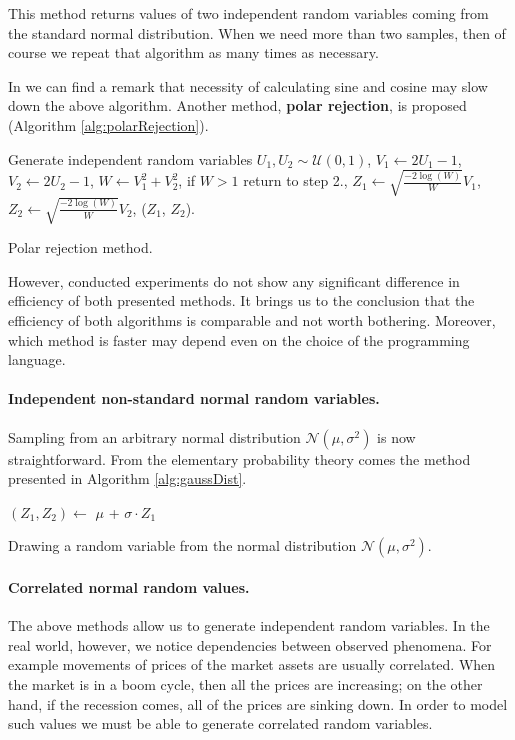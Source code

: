 \documentclass[a4paper,11pt, twoside]{book}
\theoremstyle{definition}
\theoremstyle{remark}
\newcounter{example}[chapter]
\begin{document}
This method returns values of two independent random variables coming from the standard normal distribution. When we need more than two samples, then of course we repeat that algorithm as many times as necessary.

In \cite{london} we can find a remark that necessity of calculating sine and cosine may slow down the above algorithm. Another method, \textbf{polar rejection}, is proposed (Algorithm \ref{alg:polarRejection}).
\begin{algorithm}
 \begin{algorithmic}[1]
    \State Generate independent random variables $U_1, U_2 \sim \mathcal{U}(0,1)$,
    \State $V_1 \gets 2U_1-1$,
    \State $V_2 \gets 2U_2-1$,
    \State $W \gets V_1^2 + V_2^2$,
    \State if $W > 1$ return to step 2.,
    \State $Z_1 \gets \sqrt{\frac{-2\log(W)}{W}} V_1$,
    \State $Z_2 \gets \sqrt{\frac{-2\log(W)}{W}} V_2$,
    \State \Return ($Z_1$, $Z_2$).
  \EndFunction
 \end{algorithmic}
 \caption{Polar rejection method.}
 \label{alg:polarRejection}
\end{algorithm}
However, conducted experiments do not show any significant difference in efficiency of both presented methods. It brings us to the conclusion that the efficiency of both algorithms is comparable and not worth bothering. Moreover, which method is faster may depend even on the choice of the programming language.

\paragraph{Independent non-standard normal random variables.} Sampling from an arbitrary normal distribution $\mathcal{N}(\mu, \sigma^2)$ is now straightforward. From the elementary probability theory comes the method presented in Algorithm \ref{alg:gaussDist}.
\begin{algorithm}
 \begin{algorithmic}[1]
    \State $(Z_1, Z_2) \gets $ 
    \State \Return $\mu$ + $\sigma \cdot Z_1$
  \EndFunction
 \end{algorithmic}
 \caption{Drawing a random variable from the normal distribution $\mathcal{N}(\mu, \sigma^2)$.}
 \label{alg:gaussDist}
\end{algorithm}

\paragraph{Correlated normal random values.} The above methods allow us to generate independent random variables. In the real world, however, we notice dependencies between observed phenomena. For example movements of prices of the market assets are usually correlated. When the market is in a boom cycle, then all the prices are increasing; on the other hand, if the recession comes, all of the prices are sinking down.
In order to model such values we must be able to generate correlated random variables.
\end{document}
